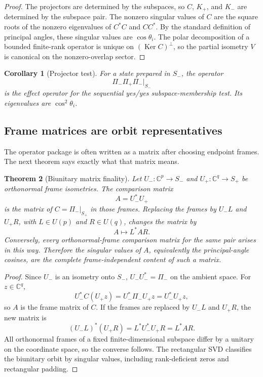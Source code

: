 \documentclass[11pt]{amsart}
\newtheorem{theorem}{Theorem}[section]
\newtheorem{corollary}[theorem]{Corollary}
\newcommand{\C}{\mathbb C}
\newcommand{\Ker}{\operatorname{Ker}}
\newcommand{\Proj}{\Pi}
\begin{document}
\begin{proof}
The projectors are determined by the subspaces, so \(C\), \(K_+\), and \(K_-\)
are determined by the subspace pair. The nonzero singular values of \(C\) are
the square roots of the nonzero eigenvalues of \(C^*C\) and \(CC^*\). By the
standard definition of principal angles, these singular values are
\(\cos\theta_i\). The polar decomposition of a bounded finite-rank operator is
unique on \((\Ker C)^\perp\), so the partial isometry \(V\) is canonical on the
nonzero-overlap sector.
\end{proof}

\begin{corollary}[Projector test]
For a state prepared in \(S_-\), the operator
\[
        \Proj_-\Proj_+\Proj_-|_{S_-}
\]
is the effect operator for the sequential yes/yes subspace-membership test. Its
eigenvalues are \(\cos^2\theta_i\).
\end{corollary}

\subsection{Frame matrices are orbit representatives}

The operator package is often written as a matrix after choosing endpoint
frames. The next theorem says exactly what that matrix means.

\begin{theorem}[Biunitary matrix finality]
Let \(U_-:\C^p\to S_-\) and \(U_+:\C^q\to S_+\) be orthonormal frame
isometries. The comparison matrix
\[
        A=U_-^*U_+
\]
is the matrix of \(C=\Proj_-|_{S_+}\) in those frames. Replacing the frames by
\(U_-L\) and \(U_+R\), with \(L\in U(p)\) and \(R\in U(q)\), changes the
matrix by
\[
        A\mapsto L^*AR.
\]
Conversely, every orthonormal-frame comparison matrix for the same pair arises
in this way. Therefore the singular values of \(A\), equivalently the
principal-angle cosines, are the complete frame-independent content of such a
matrix.
\end{theorem}

\begin{proof}
Since \(U_-\) is an isometry onto \(S_-\), \(U_-U_-^*=\Proj_-\) on the ambient
space. For \(z\in\C^q\),
\[
        U_-^*C(U_+z)=U_-^*\Proj_-U_+z=U_-^*U_+z,
\]
so \(A\) is the frame matrix of \(C\). If the frames are replaced by \(U_-L\)
and \(U_+R\), the new matrix is
\[
        (U_-L)^*(U_+R)=L^*U_-^*U_+R=L^*AR.
\]
All orthonormal frames of a fixed finite-dimensional subspace differ by a
unitary on the coordinate space, so the converse follows. The rectangular SVD
classifies the biunitary orbit by singular values, including rank-deficient
zeros and rectangular padding.
\end{proof}
\end{document}
